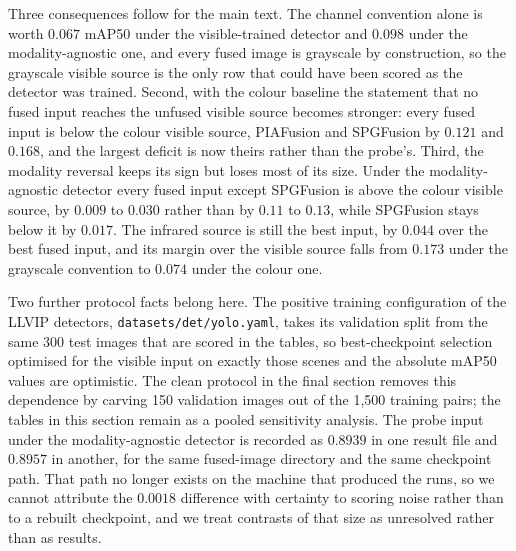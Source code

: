 \documentclass[preprint,12pt,a4paper]{elsarticle}
\begin{document}
Three consequences follow for the main text. The channel convention alone is worth
$0.067$ mAP50 under the visible-trained detector and $0.098$ under the
modality-agnostic one, and every fused image is grayscale by construction, so the
grayscale visible source is the only row that could have been scored as the detector
was trained. Second, with the colour baseline the statement that no fused input
reaches the unfused visible source becomes stronger: every fused input is below the
colour visible source, PIAFusion and SPGFusion by $0.121$ and $0.168$, and the
largest deficit is now theirs rather than the probe's. Third, the modality reversal
keeps its sign but loses most of its size. Under the modality-agnostic detector every
fused input except SPGFusion is above the colour visible source, by $0.009$ to
$0.030$ rather than by $0.11$ to $0.13$, while SPGFusion stays below it by $0.017$.
The infrared source is still the best input, by $0.044$ over the best fused input,
and its margin over the visible source falls from $0.173$ under the grayscale
convention to $0.074$ under the colour one.

Two further protocol facts belong here. The positive training configuration of the
LLVIP detectors, \texttt{datasets/det/yolo.yaml}, takes its validation split from the
same 300 test images that are scored in the tables, so best-checkpoint selection
optimised for the visible input on exactly those scenes and the absolute mAP50 values
are optimistic. The clean protocol in the final section removes this dependence by
carving 150 validation images out of the 1,500 training pairs; the tables in this
section remain as a pooled sensitivity analysis. The probe input under the
modality-agnostic detector is recorded
as $0.8939$ in one result file and $0.8957$ in another, for the same fused-image
directory and the same checkpoint path. That path no longer exists on the machine
that produced the runs, so we cannot attribute the $0.0018$ difference with certainty
to scoring noise rather than to a rebuilt checkpoint, and we treat contrasts of that
size as unresolved rather than as results.
\end{document}
